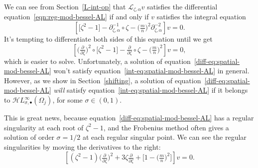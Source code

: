 \documentclass{article}
\newcommand{\singexp}[2]{\mathcal{H}L^\infty_{#1, #2}}
\newcommand{\singexpalg}[1]{\singexp{#1}{\bullet}}
\newcommand{\fracderiv}[3]{\partial^{#1}_{#2, #3}}
\newcommand{\laplace}{\mathcal{L}}
\theoremstyle{definition}
\theoremstyle{plain}
\begin{document}
We can see from Section~\ref{L-int-op} that $\laplace_{\zeta, \alpha} v$ satisfies the differential equation~\eqref{eqn:reg-mod-bessel-AL} if and only if $v$ satisfies the integral equation
\begin{equation}\label{int-eq:spatial-mod-bessel-AL}
\left[ \big[ \zeta^2 - 1 \big] - \fracderiv{-1}{\zeta}{\alpha} \circ \zeta - \big(\tfrac{m}{n}\big)^2 \fracderiv{-2}{\zeta}{\alpha} \right] v = 0.
\end{equation}
It's tempting to differentiate both sides of this equation until we get
\begin{equation}\label{diff-eq:spatial-mod-bessel-AL}
\left[ \big(\tfrac{\partial}{\partial \zeta}\big)^2 \circ \big[ \zeta^2 - 1 \big] - \tfrac{\partial}{\partial \zeta} \circ \zeta - \big(\tfrac{m}{n}\big)^2 \right] v = 0,
\end{equation}
which is easier to solve. Unfortunately, a solution of equation~\eqref{diff-eq:spatial-mod-bessel-AL} won't satisfy equation~\eqref{int-eq:spatial-mod-bessel-AL} in general. However, as we show in Section~\ref{shifting}, a solution of equation~\eqref{diff-eq:spatial-mod-bessel-AL} {\em will} satisfy equation~\eqref{int-eq:spatial-mod-bessel-AL} if it belongs to $\singexpalg{\sigma}(\Omega_j)$, for some $\sigma\in (0,1)$.

This is great news, because equation~\eqref{diff-eq:spatial-mod-bessel-AL} has a regular singularity at each root of $\zeta^2 - 1$, and the Frobenius method often gives a solution of order $\sigma=1/2$ at each regular singular point. We can see the regular singularities by moving the derivatives to the right:
\[ \left[ (\zeta^2 - 1) \big(\tfrac{\partial}{\partial \zeta}\big)^2 + 3\zeta \tfrac{\partial}{\partial \zeta} + \big[ 1 - \big(\tfrac{m}{n}\big)^2 \big] \right] v = 0. \]
\end{document}
